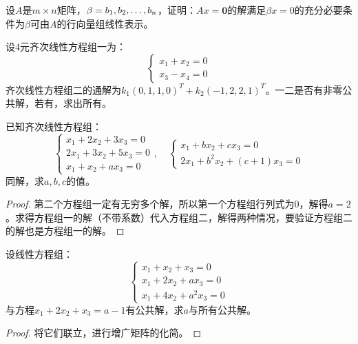 \begin{theorem}
	设$A$是$m\times n$矩阵，$\beta=b_1, b_2, \dots, b_{n}$，证明：$Ax=\mathbf{0}$的解满足$\beta x=0$的充分必要条件为$\beta$可由$A$的行向量组线性表示。
\end{theorem}

\begin{theorem}
	设$4$元齐次线性方程组一为：
	\begin{equation*}
		\begin{cases}
			x_1+x_2=0 \\
			x_3-x_4=0
		\end{cases}
	\end{equation*}
	齐次线性方程组二的通解为$k_1(0,1,1,0)^T+k_2(-1,2,2,1)^T$。一二是否有非零公共解，若有，求出所有。
\end{theorem}

\begin{theorem}
	已知齐次线性方程组：
	\begin{equation*}
		\begin{cases}
			x_1+2x_2+3x_3=0 \\
			2x_1+3x_2+5x_3=0 \\
			x_1+x_2+ax_3=0
		\end{cases},\quad
		\begin{cases}
			x_1+bx_2+cx_3=0 \\
			2x_1+b^2x_2+(c+1)x_3=0
		\end{cases}
	\end{equation*}
	同解，求$a,b,c$的值。
\end{theorem}
\begin{proof}
	第二个方程组一定有无穷多个解，所以第一个方程组行列式为$0$，解得$a=2$。求得方程组一的解（不带系数）代入方程组二，解得两种情况，要验证方程组二的解也是方程组一的解。
\end{proof}

\begin{theorem}
	设线性方程组：
	\begin{equation*}
		\begin{cases}
			x_1+x_2+x_3=0 \\
			x_1+2x_2+ax_3=0 \\
			x_1+4x_2+a^2x_3=0
		\end{cases}
	\end{equation*}
	与方程$x_1+2x_2+x_3=a-1$有公共解，求$a$与所有公共解。
\end{theorem}
\begin{proof}
	将它们联立，进行增广矩阵的化简。
\end{proof}

